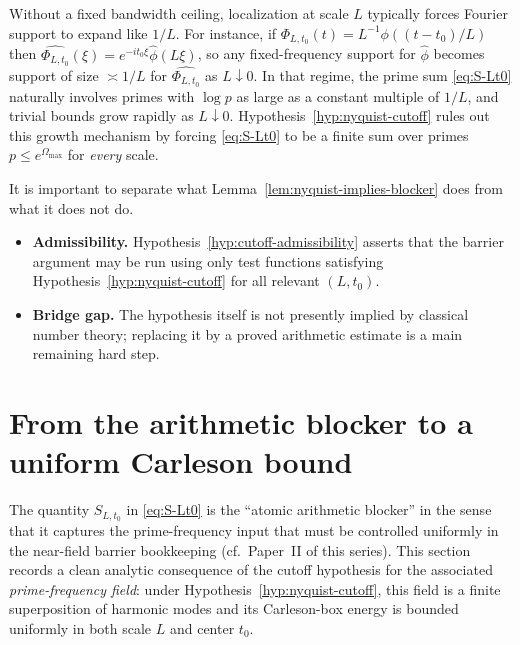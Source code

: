 \documentclass[11pt]{article}
\begin{document}
\begin{remark}\label{rem:why-cutoff}
Without a fixed bandwidth ceiling, localization at scale $L$ typically forces Fourier support to expand like $1/L$.
For instance, if $\Phi_{L,t_0}(t)=L^{-1}\phi((t-t_0)/L)$ then $\widehat{\Phi_{L,t_0}}(\xi)=e^{-it_0\xi}\widehat{\phi}(L\xi)$, so any fixed-frequency support for $\widehat{\phi}$ becomes support of size $\asymp 1/L$ for $\widehat{\Phi_{L,t_0}}$ as $L\downarrow 0$.
In that regime, the prime sum \eqref{eq:S-Lt0} naturally involves primes with $\log p$ as large as a constant multiple of $1/L$, and trivial bounds grow rapidly as $L\downarrow 0$.
Hypothesis~\ref{hyp:nyquist-cutoff} rules out this growth mechanism by forcing \eqref{eq:S-Lt0} to be a finite sum over primes $p\le e^{\Omega_{\max}}$ for \emph{every} scale.
\end{remark}

\begin{remark}\label{rem:blockers}
It is important to separate what Lemma~\ref{lem:nyquist-implies-blocker} does from what it does not do.
\begin{itemize}
\item \textbf{Admissibility.} Hypothesis~\ref{hyp:cutoff-admissibility} asserts that the barrier argument may be run using only test functions satisfying Hypothesis~\ref{hyp:nyquist-cutoff} for all relevant $(L,t_0)$.
\item \textbf{Bridge gap.} The hypothesis itself is not presently implied by classical number theory; replacing it by a proved arithmetic estimate is a main remaining hard step.
\end{itemize}
\end{remark}

\section{From the arithmetic blocker to a uniform Carleson bound}\label{sec:carleson}

The quantity $S_{L,t_0}$ in \eqref{eq:S-Lt0} is the ``atomic arithmetic blocker'' in the sense that it captures the prime-frequency input that must be controlled uniformly in the near-field barrier bookkeeping (cf.\ Paper~II of this series).
This section records a clean analytic consequence of the cutoff hypothesis for the associated \emph{prime-frequency field}: under Hypothesis~\ref{hyp:nyquist-cutoff}, this field is a finite superposition of harmonic modes and its Carleson-box energy is bounded uniformly in both scale $L$ and center $t_0$.
\end{document}
